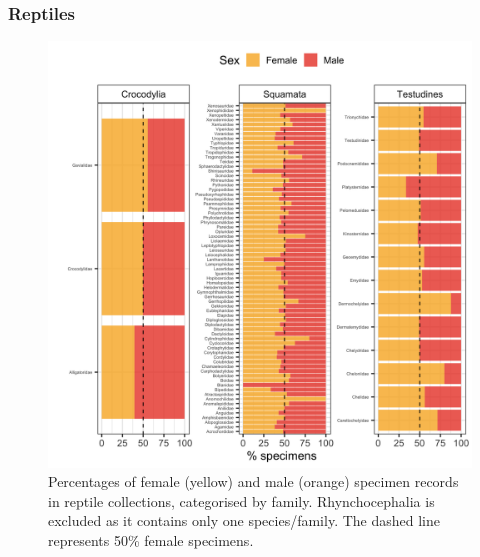 \documentclass[a4paper, 12pt]{article}
\begin{document}
\newpage

\subsubsection{Reptiles}



\newpage

\begin{figure}[H]
 \centering
  \includegraphics[width = \linewidth]{figures/all-family-reptiles.png}
  \caption{Percentages of female (yellow) and male (orange) specimen records in reptile collections, categorised by family. Rhynchocephalia is excluded as it contains only one species/family. 
  The dashed line represents 50\% female specimens.}
  \label{fig-reptile-family}
\end{figure}
\end{document}
